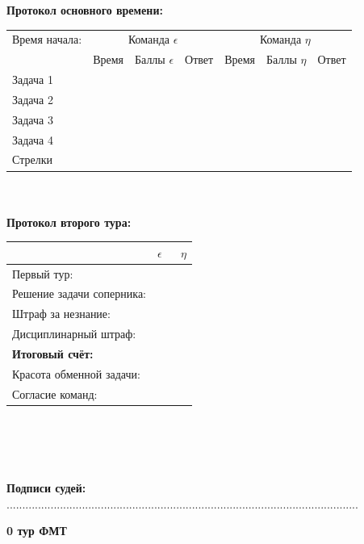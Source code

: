 \documentclass[12pt]{article}
\begin{document}
\begin{center}{\bf Протокол основного времени: } \\ 
\begin{tabular}{|p{3.3cm}|p{1.5cm}|p{2cm}|p{1.5cm}|p{1.5cm}|p{2cm}|p{1.5cm}|}
\hline Время начала: & \multicolumn{3}{c|}{Команда $\epsilon$} & \multicolumn{3}{c|}{Команда $\eta$ }\\\cline{2-7} {} & Время & Баллы $\epsilon$ & Ответ & Время & Баллы $\eta$ & Ответ \\\hline \hline \center Задача 1 &{}&{}&{}&{}&{}&{}\\[20mm]\hline \hline \center Задача 2 &{}&{}&{}&{}&{}&{}\\[20mm]\hline \hline \center Задача 3 &{}&{}&{}&{}&{}&{}\\[20mm]\hline \hline \center Задача 4 &{}&{}&{}&{}&{}&{}\\[20mm]\hline \hline \center Стрелки &{}&{}&{}&{}&{}&{}\\[20mm]\hline
\end{tabular}
$ $\\
$ $\\
{\bf Протокол второго тура: } \\ 
\begin{tabular}{ | p{7cm} | p{1cm} | p{1cm} |}
\hline
$ $ & \centering $\epsilon$ & $\;$ $\eta$ \\ \hline\raggedleft Первый тур: & & \\ \hline\raggedleft Решение задачи соперника: & & \\ \hline\raggedleft Штраф за незнание: & & \\ \hline\raggedleft Дисциплинарный штраф: & & \\ \hline\raggedleft \bf Итоговый счёт: & & \\ \hline \hline\raggedleft Красота обменной задачи: & & \\ \hline\raggedleft Согласие команд: & & \\ \hline\end{tabular}\end{center}
$ $\\
$ $\\
$ $\\
$ $\\
{\bf Подписи судей: }................................................................................................................\newpage
\begin{center}
{\Huge \bf 0 тур ФМТ}
\end{center}
\end{document}
